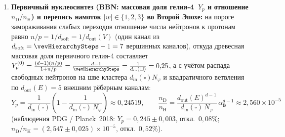 \begin{enumerate}[leftmargin=*]
\begin{enumerate}[label=(\alph*),noitemsep]
  \item раннее появление зрелых массивных ядер и галактик, регистрируемых телескопом JWST на $z \sim 10\text{--}15$ (поскольку конденсация Второй Эпохи идёт непосредственно на соседних рёбрах~$N_{12}$ вокруг выживших с Первой Эпохи точечных топологических зёрен);
  \item различие между видимым возрастом разлёта текущей барионной волны после горлышка ($\tau_{\mathrm{wave}} = \tau - \tau_{\mathrm{neck}} \leftrightarrow 13{,}77\text{--}13{,}79\ \mathrm{млрд\ лет}$) и полным двухэпоховым каузальным возрастом пузыря от момента нуклеации сида $\mathrm{IV}=263$ ($\tau_{\mathrm{total}} = \tau_{\mathrm{neck}} + \tau_{\mathrm{wave}} = (c_0/c)^2\tau_{\mathrm{wave}} \sim 26\text{--}27{,}54\ \mathrm{млрд\ лет}$), что естественным образом снимает космологический парадокс реликтовых малометалличных звёзд гало старше $13{,}8\ \mathrm{млрд\ лет}$ (таких как субгигант «Мафусаил» \texttt{HD~140283} с измеренным по параллаксу возрастом $14{,}46 \pm 0{,}8\ \mathrm{млрд\ лет}$), чьи ядра зародились на зёрнах Первой Эпохи до прохождения горлышка $\tau_{\mathrm{neck}} = 256$.
  \end{enumerate}
\item \textbf{Первичный нуклеосинтез (BBN: массовая доля гелия-4~$Y_p$ и отношение $n_{\mathrm{D}}/n_{\mathrm{H}}$) и перепись намоток $|w|\in\{1,2,3\}$ во Второй Эпохе:}
  на пороге замораживания слабых переходов отношение числа нейтронов к протонам равно $n/p = 1/d_{\mathrm{soft}} = 1/d_{\mathrm{out}}(V)$ (один канал из $d_{\mathrm{soft}} = \vevHierarchySteps - 1 = 7$ вершинных каналов), откуда древесная массовая доля первичного гелия-4 составляет $Y_p^{(0)} = \frac{(d-1)(n/p)}{1 + n/p} = \frac{d-1}{\vevHierarchySteps} = \frac{1}{d_{\mathrm{in}}(\square)} = 0{,}25$, а с учётом распада свободных нейтронов на шве кластера $d_{\mathrm{in}}(\square)N_\varphi$ и квадратичного ветвления по $d_{\mathrm{out}}(E)=5$ внешним рёберным каналам:
  \begin{equation}
  \label{eq:cosmo-bbn-yp-dh}
    Y_p = \frac{1}{d_{\mathrm{in}}(\square)}\!\left(1 - \frac{1}{d_{\mathrm{in}}(\square)\,N_\varphi}\right) \approx 0{,}24519,
    \qquad
    \frac{n_{\mathrm{D}}}{n_{\mathrm{H}}} = \frac{d_{\mathrm{out}}(E)^{d-1}}{d_{\mathrm{in}}(\square)\,N_\varphi}\,\alpha_{\mathrm{fs}}^{d-1} \approx 2{,}560\times 10^{-5}
  \end{equation}
  (наблюдения PDG / Planck~2018: $Y_p = 0{,}245 \pm 0{,}003$, откл.~$0{,}08\%$; $n_{\mathrm{D}}/n_{\mathrm{H}} = (2{,}547 \pm 0{,}025)\times 10^{-5}$, откл.~$0{,}52\%$).

\end{enumerate}
